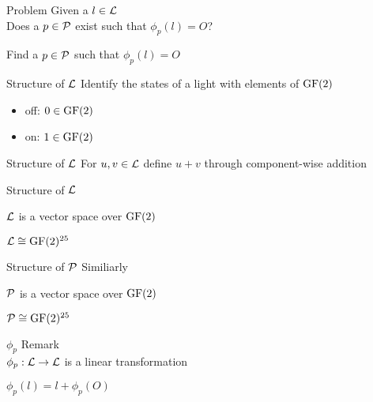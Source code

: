 \begin{frame}{Problem}
	Given a $l \in \mathcal{L}$\\
	Does a $p \in \mathcal{P}$ exist such that $\phi_{p}(l) = O$?\\
	
	\pause
	
	Find a $p \in \mathcal{P}$ such that $\phi_{p}(l) = O$
\end{frame}

\begin{frame}{Structure of $\mathcal{L}$}
	Identify the states of a light with elements of $\operatorname{GF}(2)$
	\begin{itemize}
		\item off: $0 \in \operatorname{GF}(2)$
		\item on: $1 \in \operatorname{GF}(2)$
	\end{itemize}
\end{frame}

\begin{frame}{Structure of $\mathcal{L}$}
	For $u, v \in \mathcal{L}$ define $u + v$ through component-wise addition
\end{frame}

\begin{frame}{Structure of $\mathcal{L}$}
	\begin{theorem}
		$\mathcal{L}$ is a vector space over $\operatorname{GF}(2)$
	\end{theorem}
	
	\pause
	
	\begin{corollary}
		$\mathcal{L} \cong \operatorname{GF}(2)^{25}$
	\end{corollary}
\end{frame}

\begin{frame}{Structure of $\mathcal{P}$}
	Similiarly
	
	\begin{theorem}
		$\mathcal{P}$ is a vector space over $\operatorname{GF}(2)$
	\end{theorem}
	
	\pause
	
	\begin{corollary}
		$\mathcal{P} \cong \operatorname{GF}(2)^{25}$
	\end{corollary}
\end{frame}

\begin{frame}{$\phi_{p}$}
	Remark\\
	$\phi_{p} : \mathcal{L} \rightarrow \mathcal{L}$ is  a linear transformation
	
	\pause
	
	$\phi_{p}(l) = l + \phi_{p}(O)$
\end{frame}

